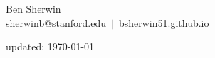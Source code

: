 \documentclass[11pt]{article}
\begin{document}
\begin{center}
    {\huge Ben Sherwin} \\[6pt]
    sherwinb@stanford.edu  $\,|\,$
    \href{http://bsherwin51.github.io}{bsherwin51.github.io}
\end{center}






%






% 

\vfill \hfill
updated: \today
\end{document}
